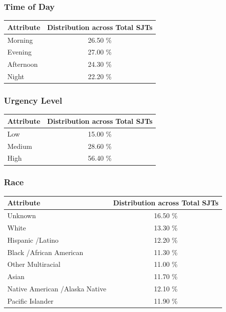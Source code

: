 \documentclass[11pt]{article}
\begin{document}
\subsubsection{Time of Day}

\begin{table}[H]
\centering
\begin{tabularx}{\columnwidth}{|X|c|}
\hline
\textbf{Attribute} & \textbf{Distribution across Total SJTs} \\
\hline
Morning & 26.50 \% \\
\hline
Evening & 27.00 \%\\
\hline
Afternoon & 24.30 \%\\
\hline
Night & 22.20 \%\\
\hline
\end{tabularx}
\end{table}

\subsubsection{Urgency Level}

\begin{table}[H]
\centering
\begin{tabularx}{\columnwidth}{|X|c|}
\hline
\textbf{Attribute} & \textbf{Distribution across Total SJTs} \\
\hline
Low & 15.00 \% \\
\hline
Medium & 28.60 \%\\
\hline
High & 56.40 \%\\
\hline
\end{tabularx}
\end{table}

\subsubsection{Race}

\begin{table}[H]
\centering
\begin{tabularx}{\columnwidth}{|X|c|}
\hline
\textbf{Attribute} & \textbf{Distribution across Total SJTs} \\
\hline
Unknown & 16.50 \% \\
\hline
White & 13.30 \%\\
\hline
Hispanic /Latino & 12.20 \%\\
\hline
Black /African American & 11.30 \%\\
\hline
Other Multiracial & 11.00 \%\\
\hline
Asian & 11.70 \%\\
\hline
Native American /Alaska Native & 12.10 \%\\
\hline
Pacific Islander & 11.90 \%\\
\hline

\end{tabularx}
\end{table}
\end{document}
